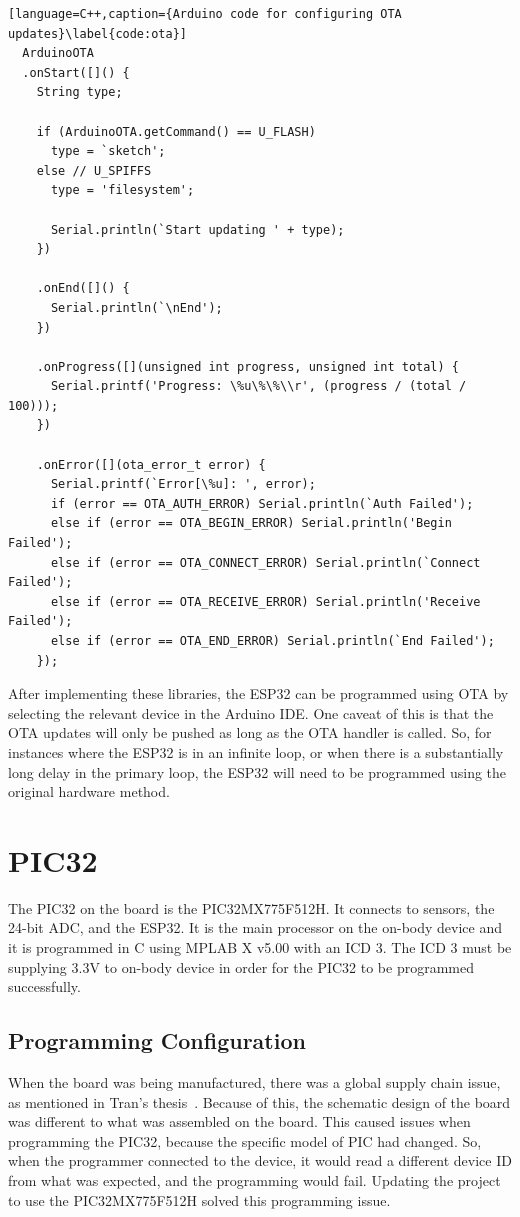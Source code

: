 \begin{lstlisting}[language=C++,caption={Arduino code for configuring OTA updates}\label{code:ota}]
  ArduinoOTA
  .onStart([]() {
    String type;

    if (ArduinoOTA.getCommand() == U_FLASH)
      type = `sketch';
    else // U_SPIFFS
      type = 'filesystem';

      Serial.println(`Start updating ' + type);
    })

    .onEnd([]() {
      Serial.println(`\nEnd');
    })

    .onProgress([](unsigned int progress, unsigned int total) {
      Serial.printf('Progress: \%u\%\%\\r', (progress / (total / 100)));
    })

    .onError([](ota_error_t error) {
      Serial.printf(`Error[\%u]: ', error);
      if (error == OTA_AUTH_ERROR) Serial.println(`Auth Failed');
      else if (error == OTA_BEGIN_ERROR) Serial.println('Begin Failed');
      else if (error == OTA_CONNECT_ERROR) Serial.println(`Connect Failed');
      else if (error == OTA_RECEIVE_ERROR) Serial.println('Receive Failed');
      else if (error == OTA_END_ERROR) Serial.println(`End Failed');
    });

\end{lstlisting}

After implementing these libraries, the ESP32 can be programmed using OTA by selecting the relevant device in the Arduino IDE.
One caveat of this is that the OTA updates will only be pushed as long as the OTA handler is called.
So, for instances where the ESP32 is in an infinite loop, or when there is a substantially long delay in the primary loop,
the ESP32 will need to be programmed using the original hardware method.


\section{PIC32}
The PIC32 on the board is the PIC32MX775F512H.
It connects to sensors, the 24-bit ADC, and the ESP32.
It is the main processor on the on-body device and it is programmed in C using MPLAB X v5.00 with an ICD 3.
The ICD 3 must be supplying 3.3V to on-body device in order for the PIC32 to be programmed successfully.

\subsection{Programming Configuration}
When the board was being manufactured, there was a global supply chain issue, as mentioned in Tran's thesis~\cite{Tran:2022}.
Because of this, the schematic design of the board was different to what was assembled on the board.
This caused issues when programming the PIC32, because the specific model of PIC had changed.
So, when the programmer connected to the device, it would read a different device ID from what was expected,
and the programming would fail.
Updating the project to use the PIC32MX775F512H solved this programming issue.


